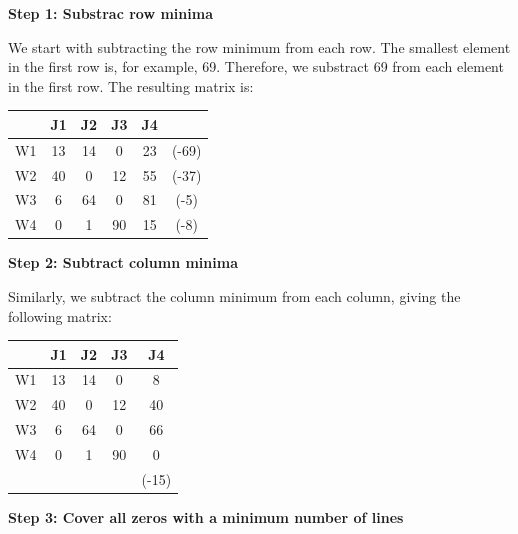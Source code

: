 \documentclass{llncs}
\begin{document}
\textbf{Step 1: Substrac row minima}

We start with subtracting the row minimum from each row. The smallest element in the first row is, for example, 69. Therefore, we substract 69 from each element in the first row. The resulting matrix is:
\begin{table}[H]
  \centering
    \begin{tabular}{cccccc}
\toprule         & J1    & J2    & J3    & J4    &  \\
\midrule   \phantom{2333} W1 \phantom{2333}   & \phantom{2333} 13 \phantom{2333}   & \phantom{2333} 14 \phantom{2333} & \phantom{2333} 0 \phantom{2333}    & \phantom{2333} 23 \phantom{2333} & \phantom{2333} (-69) \phantom{2333} \\
    W2    & 40    & 0     & 12    & 55    & (-37) \\
    W3    & 6     & 64    & 0     & 81    & (-5) \\
    W4    & 0     & 1     & 90    & 15    & (-8) \\
\bottomrule    \end{tabular}%
\end{table}%

\textbf{Step 2: Subtract column minima}

Similarly, we subtract the column minimum from each column, giving the following matrix:
\begin{table}[H]
  \centering
    \begin{tabular}{ccccc}
    \toprule
          & J1    & J2    & J3    & J4 \\
    \midrule
    \phantom{2333} W1 \phantom{2333}   & \phantom{2333} 13 \phantom{2333}   & \phantom{2333} 14 \phantom{2333}   & \phantom{2333} 0 \phantom{2333}    & \phantom{2333} 8 \phantom{2333} \\
    W2    & 40    & 0     & 12    & 40 \\
    W3    & 6     & 64    & 0     & 66 \\
    W4    & 0     & 1     & 90    & 0 \\
          &       &       &       & (-15) \\
    \bottomrule
    \end{tabular}%
\end{table}%

\textbf{Step 3: Cover all zeros with a minimum number of lines}
\end{document}

